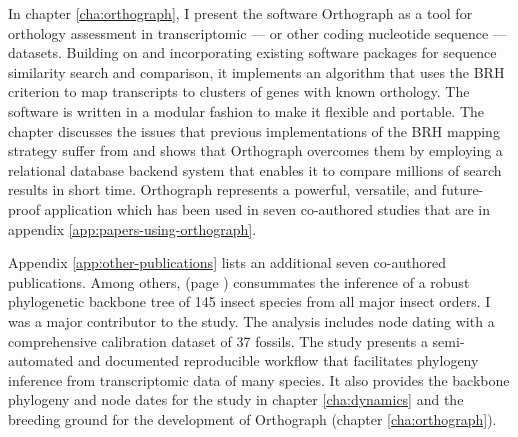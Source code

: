 In chapter \ref{cha:orthograph}, I present the software Orthograph as a
tool for orthology assessment in transcriptomic --- or other coding
nucleotide sequence --- datasets.  Building on and incorporating existing
software packages for sequence similarity search and comparison, it
implements an algorithm that uses the BRH criterion to map transcripts
to clusters of genes with known orthology.  The software is written in a
modular fashion to make it flexible and portable.  The chapter discusses the
issues that previous implementations of the BRH mapping strategy suffer
from and shows that Orthograph overcomes them by employing a relational
database backend system that enables it to compare millions of search
results in short time.  Orthograph represents a powerful, versatile, and
future-proof application which has been used in seven co-authored
studies \citep{Mayer2016, Pauli2016, Bank2017, Dowling2017, Peters2017,
Gillung2018, Johnson2018} that are in appendix
\ref{app:papers-using-orthograph}.

Appendix \ref{app:other-publications} lists an additional seven
co-authored publications.  Among others, \citet{Misof2014} (page
\pageref{app:Misof2014}) consummates the inference of a robust
phylogenetic backbone tree of 145 insect species from all major insect
orders.  I was a major contributor to the study.  The analysis includes
node dating with a comprehensive calibration dataset of 37 fossils.  The
study presents a semi-automated and documented reproducible workflow
that facilitates phylogeny inference from transcriptomic data of many
species.  It also provides the backbone phylogeny and node dates for the
study in chapter \ref{cha:dynamics} and the breeding ground for the
development of Orthograph (chapter \ref{cha:orthograph}).
